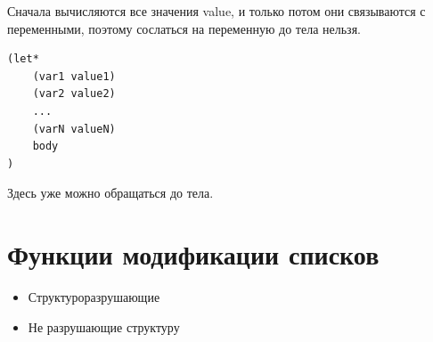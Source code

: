 Сначала вычисляются все значения {\ttfamily value}, и только потом
они связываются с переменными, поэтому сослаться на переменную
до тела нельзя.

\begin{lstlisting}
(let*
    (var1 value1)
    (var2 value2)
    ...
    (varN valueN)
    body
)
\end{lstlisting}

Здесь уже можно обращаться до тела.

\section{Функции модификации списков}

\begin{itemize}
    \item Структуроразрушающие
    \item Не разрушающие структуру
\end{itemize}

